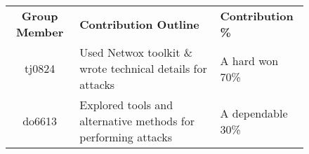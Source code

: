 \begin{figure}[h]
\centering
\begin{tabular}{|c|p{9.5cm}|l|}
\hline
{\bf Group Member} & {\bf Contribution Outline} & {\bf Contribution \%} \\
\hhline{|=|=|=|}
tj0824 & Used Netwox toolkit \& wrote technical details for attacks & A hard won 70\% \\
\hline
do6613 & Explored tools and alternative methods for performing attacks & A dependable 30\% \\
\hline
\end{tabular}
\end{figure}